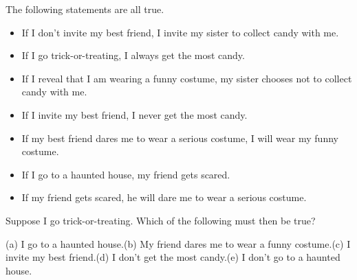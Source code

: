 The following statements are all true.
\begin{itemize}
\item If I don't invite my best friend, I invite my sister to collect candy with me.
\item If I go trick-or-treating, I always get the most candy.
\item If I reveal that I am wearing a funny costume, my sister chooses not to collect candy with me.
\item If I invite my best friend, I never get the most candy.
\item If my best friend dares me to wear a serious costume, I will wear my funny costume.
\item If I go to a haunted house, my friend gets scared.
\item If my friend gets scared, he will dare me to wear a serious costume.
\end{itemize}
Suppose I go trick-or-treating. Which of the following must then be true?

(a) I go to a haunted house.\quad (b) My friend dares me to wear a funny costume.\quad (c) I invite my best friend.\quad (d) I don't get the most candy.\quad (e) I don't go to a haunted house.
